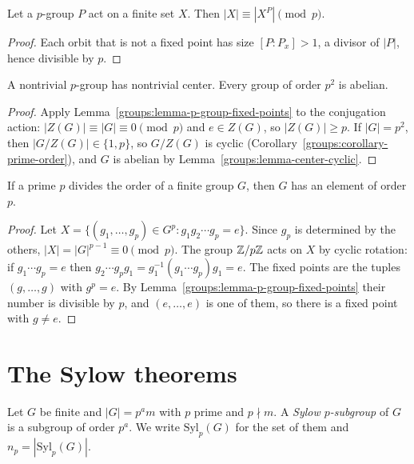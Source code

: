 \begin{lemma}\label{groups:lemma-p-group-fixed-points}
Let a $p$-group $P$ act on a finite set $X$. Then $|X| \equiv |X^P| \pmod p$.
\end{lemma}

\begin{proof}
Each orbit that is not a fixed point has size $[P : P_x] > 1$, a divisor of $|P|$,
hence divisible by $p$.
\end{proof}

\begin{proposition}\label{groups:proposition-p-group-center}
A nontrivial $p$-group has nontrivial center. Every group of order $p^2$ is
abelian.
\end{proposition}

\begin{proof}
Apply Lemma~\ref{groups:lemma-p-group-fixed-points} to the conjugation action:
$|Z(G)| \equiv |G| \equiv 0 \pmod p$ and $e \in Z(G)$, so $|Z(G)| \geq p$. If
$|G| = p^2$, then $|G/Z(G)| \in \{1, p\}$, so $G/Z(G)$ is cyclic
(Corollary~\ref{groups:corollary-prime-order}), and $G$ is abelian by
Lemma~\ref{groups:lemma-center-cyclic}.
\end{proof}

\begin{theorem}[Cauchy]\label{groups:theorem-cauchy}
If a prime $p$ divides the order of a finite group $G$, then $G$ has an element of
order $p$.
\end{theorem}

\begin{proof}
Let $X = \{(g_1, \ldots, g_p) \in G^p : g_1 g_2 \cdots g_p = e\}$. Since $g_p$ is
determined by the others, $|X| = |G|^{p-1} \equiv 0 \pmod p$. The group $\mathbb{Z}/p\mathbb{Z}$
acts on $X$ by cyclic rotation: if $g_1 \cdots g_p = e$ then
$g_2 \cdots g_p g_1 = g_1^{-1}(g_1 \cdots g_p)g_1 = e$. The fixed points are the tuples
$(g, \ldots, g)$ with $g^p = e$. By Lemma~\ref{groups:lemma-p-group-fixed-points}
their number is divisible by $p$, and $(e, \ldots, e)$ is one of them, so there is
a fixed point with $g \neq e$.
\end{proof}

\section{The Sylow theorems}\label{groups:section-sylow}

\begin{definition}\label{groups:definition-sylow}
Let $G$ be finite and $|G| = p^a m$ with $p$ prime and $p \nmid m$. A \emph{Sylow
$p$-subgroup} of $G$ is a subgroup of order $p^a$. We write $\mathrm{Syl}_p(G)$ for
the set of them and $n_p = |\mathrm{Syl}_p(G)|$.
\end{definition}

